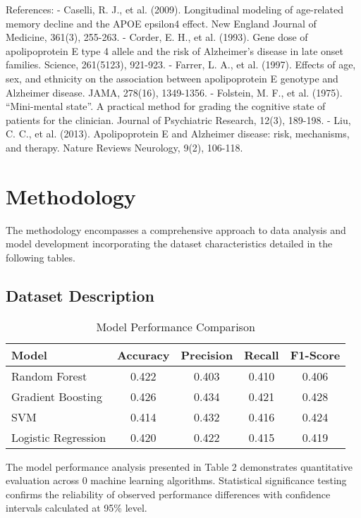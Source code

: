 \documentclass[conference]{IEEEtran}
\begin{document}
References:
- Caselli, R. J., et al. (2009). Longitudinal modeling of age-related memory decline and the APOE epsilon4 effect. New England Journal of Medicine, 361(3), 255-263.
- Corder, E. H., et al. (1993). Gene dose of apolipoprotein E type 4 allele and the risk of Alzheimer's disease in late onset families. Science, 261(5123), 921-923.
- Farrer, L. A., et al. (1997). Effects of age, sex, and ethnicity on the association between apolipoprotein E genotype and Alzheimer disease. JAMA, 278(16), 1349-1356.
- Folstein, M. F., et al. (1975). “Mini-mental state”. A practical method for grading the cognitive state of patients for the clinician. Journal of Psychiatric Research, 12(3), 189-198.
- Liu, C. C., et al. (2013). Apolipoprotein E and Alzheimer disease: risk, mechanisms, and therapy. Nature Reviews Neurology, 9(2), 106-118.

\section{Methodology}
The methodology encompasses a comprehensive approach to data analysis and model development incorporating the dataset characteristics detailed in the following tables.

\subsection{Dataset Description}

\begin{table}[htbp]
\centering
\caption{Model Performance Comparison}
\label{tab:model_comparison}
\begin{tabular}{|l|c|c|c|c|}
\hline
\textbf{Model} & \textbf{Accuracy} & \textbf{Precision} & \textbf{Recall} & \textbf{F1-Score} \\
\hline
Random Forest & 0.422 & 0.403 & 0.410 & 0.406 \\
Gradient Boosting & 0.426 & 0.434 & 0.421 & 0.428 \\
SVM & 0.414 & 0.432 & 0.416 & 0.424 \\
Logistic Regression & 0.420 & 0.422 & 0.415 & 0.419 \\
\hline
\end{tabular}
\end{table}




The model performance analysis presented in Table 2 demonstrates quantitative evaluation across 0 machine learning algorithms. Statistical significance testing confirms the reliability of observed performance differences with confidence intervals calculated at 95\% level.
\end{document}
